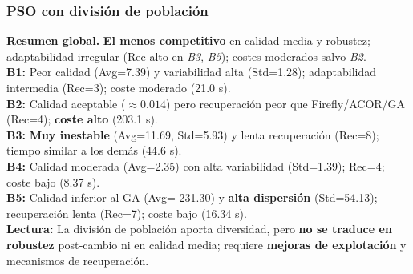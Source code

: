 \documentclass[10pt,twocolumn]{article}
\begin{document}
\begin{table}[H]
\centering
\caption{PSO dividido (population split): resultados promedios por benchmark.}
\label{tab:pso-dividido}
\scriptsize
{}
\end{table}

\subsubsection*{PSO con división de población}
\textbf{Resumen global.} \textbf{El menos competitivo} en calidad media y robustez; adaptabilidad irregular (Rec alto en \textit{B3}, \textit{B5}); costes moderados salvo \textit{B2}. \\
\textbf{B1:} Peor calidad (Avg=7.39) y variabilidad alta (Std=1.28); adaptabilidad intermedia (Rec=3); coste moderado (21.0 s). \\
\textbf{B2:} Calidad aceptable ($\approx 0.014$) pero recuperación peor que Firefly/ACOR/GA (Rec=4); \textbf{coste alto} (203.1 s). \\
\textbf{B3:} \textbf{Muy inestable} (Avg=11.69, Std=5.93) y lenta recuperación (Rec=8); tiempo similar a los demás (44.6 s). \\
\textbf{B4:} Calidad moderada (Avg=2.35) con alta variabilidad (Std=1.39); Rec=4; coste bajo (8.37 s). \\
\textbf{B5:} Calidad inferior al GA (Avg=-231.30) y \textbf{alta dispersión} (Std=54.13); recuperación lenta (Rec=7); coste bajo (16.34 s). \\
\textbf{Lectura:} La división de población aporta diversidad, pero \textbf{no se traduce en robustez} post‐cambio ni en calidad media; requiere \textbf{mejoras de explotación} y mecanismos de recuperación.
\end{document}
